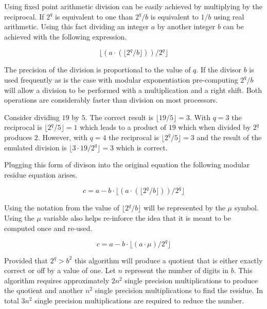 \documentclass[b5paper]{book}
\begin{document}
Using fixed point arithmetic division can be easily achieved by multiplying by the reciprocal.  If $2^q$ is equivalent to one than $2^q/b$ is 
equivalent to $1/b$ using real arithmetic.  Using this fact dividing an integer $a$ by another integer $b$ can be achieved with the following
expression.

\begin{equation}
\lfloor (a \cdot (\lfloor 2^q / b \rfloor))/2^q \rfloor
\end{equation}

The precision of the division is proportional to the value of $q$.  If the divisor $b$ is used frequently as is the case with 
modular exponentiation pre-computing $2^q/b$ will allow a division to be performed with a multiplication and a right shift.  Both operations
are considerably faster than division on most processors.  

Consider dividing $19$ by $5$.  The correct result is $\lfloor 19/5 \rfloor = 3$.  With $q = 3$ the reciprocal is $\lfloor 2^q/5 \rfloor = 1$ which
leads to a product of $19$ which when divided by $2^q$ produces $2$.  However, with $q = 4$ the reciprocal is $\lfloor 2^q/5 \rfloor = 3$ and
the result of the emulated division is $\lfloor 3 \cdot 19 / 2^q \rfloor = 3$ which is correct.  

Plugging this form of divison into the original equation the following modular residue equation arises.

\begin{equation}
c = a - b \cdot \lfloor (a \cdot (\lfloor 2^q / b \rfloor))/2^q \rfloor
\end{equation}

Using the notation from \cite{BARRETT} the value of $\lfloor 2^q / b \rfloor$ will be represented by the $\mu$ symbol.  Using the $\mu$
variable also helps re-inforce the idea that it is meant to be computed once and re-used.

\begin{equation}
c = a - b \cdot \lfloor (a \cdot \mu)/2^q \rfloor
\end{equation}

Provided that $2^q > b^2$ this algorithm will produce a quotient that is either exactly correct or off by a value of one.  Let $n$ represent
the number of digits in $b$.  This algorithm requires approximately $2n^2$ single precision multiplications to produce the quotient and 
another $n^2$ single precision multiplications to find the residue.  In total $3n^2$ single precision multiplications are required to 
reduce the number.  
\end{document}
